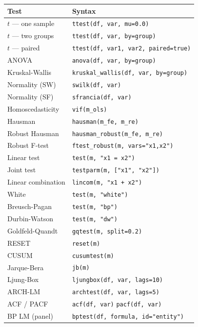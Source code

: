 \begin{center}
\begin{tabular}{ll}
\toprule
\textbf{Test} & \textbf{Syntax} \\
\midrule
$t$ — one sample    & \texttt{ttest(df, var, mu=0.0)} \\
$t$ — two groups    & \texttt{ttest(df, var, by=group)} \\
$t$ — paired        & \texttt{ttest(df, var1, var2, paired=true)} \\
ANOVA               & \texttt{anova(df, var, by=group)} \\
Kruskal-Wallis      & \texttt{kruskal\_wallis(df, var, by=group)} \\
\midrule
Normality (SW)      & \texttt{swilk(df, var)} \\
Normality (SF)      & \texttt{sfrancia(df, var)} \\
Homoscedasticity    & \texttt{vif(m\_ols)} \\
Hausman             & \texttt{hausman(m\_fe, m\_re)} \\
Robust Hausman      & \texttt{hausman\_robust(m\_fe, m\_re)} \\
Robust F-test       & \texttt{ftest\_robust(m, vars="x1,x2")} \\
Linear test         & \texttt{test(m, "x1 = x2")} \\
Joint test          & \texttt{testparm(m, ["x1", "x2"])} \\
Linear combination  & \texttt{lincom(m, "x1 + x2")} \\
White               & \texttt{test(m, "white")} \\
Breusch-Pagan       & \texttt{test(m, "bp")} \\
Durbin-Watson       & \texttt{test(m, "dw")} \\
Goldfeld-Quandt     & \texttt{gqtest(m, split=0.2)} \\
RESET               & \texttt{reset(m)} \\
CUSUM               & \texttt{cusumtest(m)} \\
Jarque-Bera         & \texttt{jb(m)} \\
Ljung-Box           & \texttt{ljungbox(df, var, lags=10)} \\
ARCH-LM             & \texttt{archtest(df, var, lags=5)} \\
ACF / PACF          & \texttt{acf(df, var)} \quad \texttt{pacf(df, var)} \\
BP LM (panel)       & \texttt{bptest(df, formula, id="entity")} \\

\end{tabular}
\end{center}
